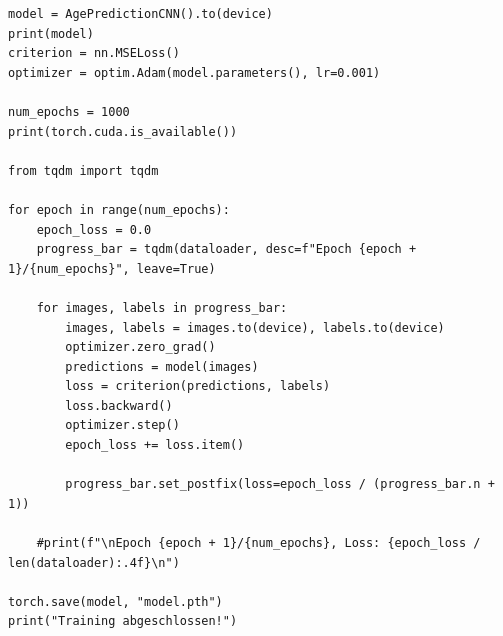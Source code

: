 \begin{verbatim}
model = AgePredictionCNN().to(device)
print(model)
criterion = nn.MSELoss()
optimizer = optim.Adam(model.parameters(), lr=0.001)

num_epochs = 1000
print(torch.cuda.is_available())

from tqdm import tqdm

for epoch in range(num_epochs):
    epoch_loss = 0.0
    progress_bar = tqdm(dataloader, desc=f"Epoch {epoch + 1}/{num_epochs}", leave=True)

    for images, labels in progress_bar:
        images, labels = images.to(device), labels.to(device)
        optimizer.zero_grad()
        predictions = model(images)
        loss = criterion(predictions, labels)
        loss.backward()
        optimizer.step()
        epoch_loss += loss.item()

        progress_bar.set_postfix(loss=epoch_loss / (progress_bar.n + 1))

    #print(f"\nEpoch {epoch + 1}/{num_epochs}, Loss: {epoch_loss / len(dataloader):.4f}\n")

torch.save(model, "model.pth")
print("Training abgeschlossen!")
\end{verbatim}
